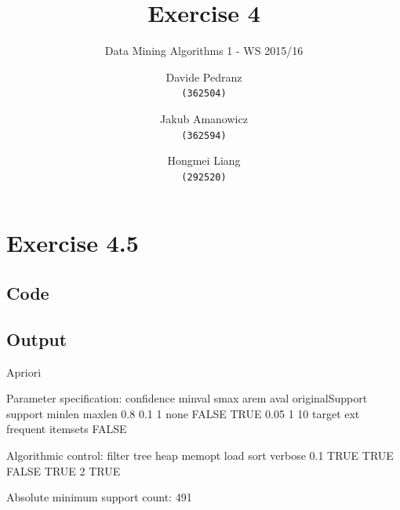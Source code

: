 \documentclass{scrartcl}
\title{Exercise 4}
\subtitle{Data Mining Algorithms 1 - WS 2015/16}
\author{
  Davide Pedranz\\ \texttt{(362504)}
  \and
  Jakub Amanowicz \\ \texttt{(362594)}
  \and
  Hongmei Liang\\  \texttt{(292520)}
}
\begin{document}

\section*{Exercise 4.5}

\subsection*{Code}


\bigskip
\bigskip

\subsection*{Output}
\begin{Schunk}
\begin{Soutput}
Apriori

Parameter specification:
 confidence minval smax arem  aval originalSupport support minlen maxlen
        0.8    0.1    1 none FALSE            TRUE    0.05      1     10
            target   ext
 frequent itemsets FALSE

Algorithmic control:
 filter tree heap memopt load sort verbose
    0.1 TRUE TRUE  FALSE TRUE    2    TRUE

Absolute minimum support count: 491 


\end{Soutput}
\end{Schunk}
\end{document}
